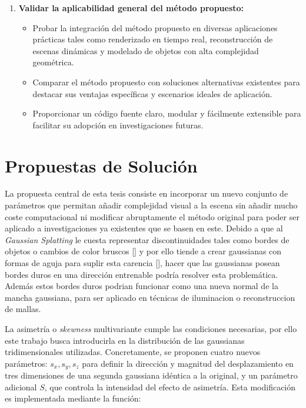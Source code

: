\begin{enumerate}
\item \textbf{Validar la aplicabilidad general del método propuesto:}
\begin{itemize}
    \item Probar la integración del método propuesto en diversas aplicaciones prácticas tales como renderizado en tiempo real, 
        reconstrucción de escenas dinámicas y modelado de objetos con alta complejidad geométrica.
    \item Comparar el método propuesto con soluciones alternativas existentes para destacar sus ventajas específicas y escenarios ideales de aplicación.
    \item Proporcionar un código fuente claro, modular y fácilmente extensible para facilitar su adopción en investigaciones futuras.
\end{itemize}
\end{enumerate}


\section{Propuestas de Solución}
La propuesta central de esta tesis consiste en incorporar un nuevo conjunto de parámetros que permitan añadir complejidad visual a la escena sin añadir
mucho coste computacional ni modificar abruptamente el método original para poder ser aplicado a investigaciones ya existentes que se basen en este. 
Debido a que al \textit{Gaussian Splatting} le cuesta representar discontinuidades tales como bordes de objetos o cambios
de color bruscos [\cite{qu2024discgsdiscontinuityawaregaussiansplatting}] y por ello tiende a crear gaussianas con formas de aguja para suplir esta carencia
[\cite{hyung2024effectiverankanalysisregularization, huang2024spectralgstaming3dgaussian,yu2023mipsplattingaliasfree3dgaussian}], 
hacer que las gaussianas posean bordes duros en una dirección entrenable podría resolver esta problemática. 
Además estos bordes duros podrian funcionar como una nueva normal de la mancha gaussiana, para ser aplicado en técnicas de iluminacion o reconstruccion de mallas.    

La asimetría o \textit{skewness} multivariante cumple las condiciones necesarias, por ello este trabajo busca introducirla en la distribución de las 
gaussianas tridimensionales utilizadas. Concretamente, se proponen cuatro nuevos parámetros: $s_x, s_y, s_z$ para definir 
la dirección y magnitud del desplazamiento en tres dimensiones de una segunda gaussiana idéntica a la original, y un parámetro adicional $S$, que 
controla la intensidad del efecto de asimetría. Esta modificación es implementada mediante la función:

